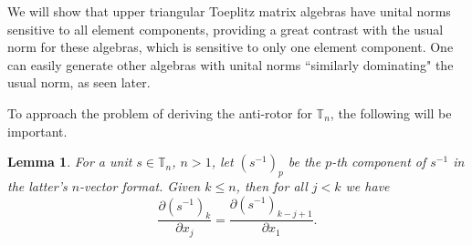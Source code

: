 \documentclass{amsart}
\numberwithin{equation}{section}
\newtheorem{lemma}[theorem]{Lemma}
\theoremstyle{definition}
\numberwithin{theorem}{section}
\begin{document}
We will show that upper triangular Toeplitz matrix algebras have unital norms sensitive to all element components, providing a great contrast with the usual norm for these algebras, which is sensitive to only one element component.  One can easily generate other algebras with unital norms ``similarly dominating" the usual norm, as seen later.

To approach the problem of deriving the anti-rotor for $\mathbb{T}_n$, the following will be important.

\begin{lemma} \label{5/7/22.15} For a unit $s\in \mathbb{T}_n$,  $n>1$, let $\left( s^{-1} \right)_p$ be the $p$-th component of $s^{-1}$ in the latter's $n$-vector format.  Given $k\le n$, then for all $j<k$ we have \begin{equation}\label{5/6/22.10} \frac{\partial \left( s^{-1} \right)_k}{\partial x_j} = \frac{\partial \left( s^{-1} \right)_{k-j+1}}{\partial x_1}.\end{equation}
\end{lemma}
\end{document}
